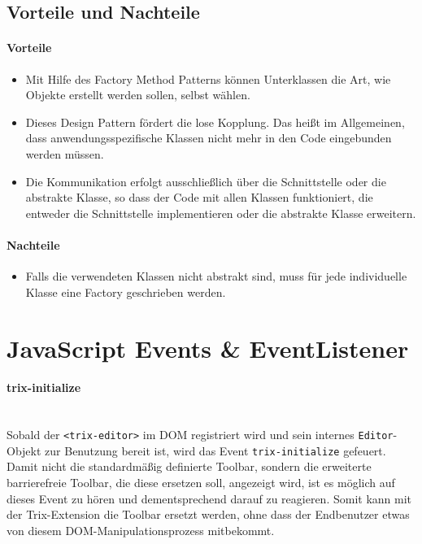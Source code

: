 \subsection{Vorteile und Nachteile}
\paragraph{Vorteile}

\begin{itemize}
	\item Mit Hilfe des Factory Method Patterns können Unterklassen die Art, wie Objekte erstellt werden sollen, selbst wählen.
	\item Dieses Design Pattern fördert die lose Kopplung. Das heißt im Allgemeinen, dass anwendungsspezifische Klassen 			nicht mehr in den Code eingebunden werden müssen. 
	\item Die Kommunikation erfolgt ausschließlich über die Schnittstelle oder die abstrakte Klasse, so dass der Code mit allen 		Klassen funktioniert, die entweder die Schnittstelle implementieren oder die abstrakte Klasse erweitern.
\end{itemize}

\paragraph{Nachteile}

\begin{itemize}
	\item Falls die verwendeten Klassen nicht abstrakt sind, muss für jede individuelle Klasse eine Factory geschrieben werden. %
\end{itemize}

\section{JavaScript Events \& EventListener}
\paragraph{trix-initialize}\mbox{}\\
Sobald der \texttt{<trix-editor>} im DOM registriert wird und sein internes \texttt{Editor}-Objekt zur Benutzung bereit ist, wird das Event \texttt{trix-initialize} gefeuert.\\
Damit nicht die standardmäßig definierte Toolbar, sondern die erweiterte barrierefreie Toolbar, die diese ersetzen soll, angezeigt wird, ist es möglich auf dieses Event zu hören und dementsprechend darauf zu reagieren. Somit kann mit der Trix-Extension die Toolbar ersetzt werden, ohne dass der Endbenutzer etwas von diesem DOM-Manipulationsprozess mitbekommt. %

